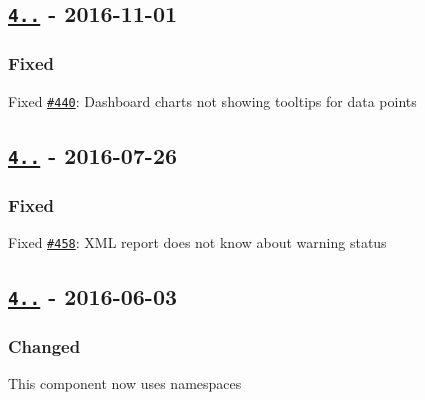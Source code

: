 \subsection*{\href{https://github.com/sebastianbergmann/php-code-coverage/compare/4.0.1...4.0.2}{\tt 4..} -\/ 2016-\/11-\/01}

\subsubsection*{Fixed}


\begin{DoxyItemize}
\item Fixed \href{https://github.com/sebastianbergmann/php-code-coverage/pull/440}{\tt \#440}\+: Dashboard charts not showing tooltips for data points
\end{DoxyItemize}

\subsection*{\href{https://github.com/sebastianbergmann/php-code-coverage/compare/4.0.0...4.0.1}{\tt 4..} -\/ 2016-\/07-\/26}

\subsubsection*{Fixed}


\begin{DoxyItemize}
\item Fixed \href{https://github.com/sebastianbergmann/php-code-coverage/pull/458}{\tt \#458}\+: X\+ML report does not know about warning status
\end{DoxyItemize}

\subsection*{\href{https://github.com/sebastianbergmann/php-code-coverage/compare/3.3...4.0.0}{\tt 4..} -\/ 2016-\/06-\/03}

\subsubsection*{Changed}


\begin{DoxyItemize}
\item This component now uses namespaces 
\end{DoxyItemize}